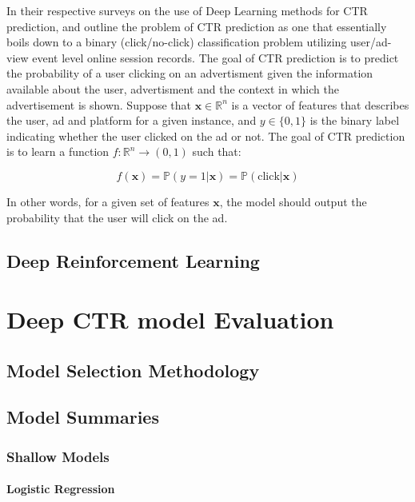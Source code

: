 \documentclass{mldsmsc}
\begin{document}
In their respective surveys on the use of Deep Learning methods for CTR prediction, \cite{RefWorks:gu2021ad} and \cite{RefWorks:zhang2021deep} outline the 
problem of CTR prediction as one that essentially boils down to a binary (click/no-click) classification problem utilizing user/ad-view event level 
online session records. The goal of CTR prediction is to predict the probability of a user clicking on an advertisment given the information available
about the user, advertisment and the context in which the advertisement is shown. Suppose that $\mathbf{x} \in \mathbb{R}^n$
is a vector of features that describes the user, ad and platform for a given instance, and
$y \in \{0, 1\}$ is the binary label indicating whether the user clicked on the ad or not. The goal of CTR prediction is to learn a function
$f: \mathbb{R}^n \rightarrow (0,1)$ such that:

$$
f(\mathbf{x}) = \mathbb{P}(y = 1 | \mathbf{x}) = \mathbb{P}(\text{click}| \mathbf{x})
$$

In other words, for a given set of features $\mathbf{x}$, the model should output the probability that the user will click on the ad.

\section{Deep Reinforcement Learning}

\chapter{Deep CTR model Evaluation}
\label{chap:deep-ctr-model-evaluation}

\section{Model Selection Methodology}

\section{Model Summaries}

\subsection{Shallow Models}

\subsubsection{Logistic Regression}
\end{document}

